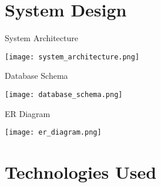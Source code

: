 \documentclass{beamer}
\begin{document}
\section{System Design}

\begin{frame}{System Architecture}
  \begin{center}
    \texttt{[image: system\_architecture.png]}
  \end{center}
\end{frame}

\begin{frame}{Database Schema}
  \begin{center}
    \texttt{[image: database\_schema.png]}
  \end{center}
\end{frame}

\begin{frame}{ER Diagram}
  \begin{center}
    \texttt{[image: er\_diagram.png]}
  \end{center}
\end{frame}

\section{Technologies Used}
\end{document}

